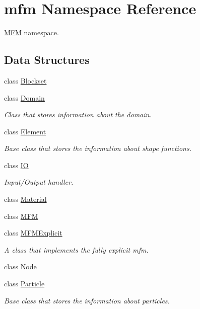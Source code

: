 \hypertarget{namespacemfm}{}\section{mfm Namespace Reference}
\label{namespacemfm}


\hyperlink{classmfm_1_1_m_f_m}{M\+FM} namespace.  


\subsection*{Data Structures}
\begin{DoxyCompactItemize}
\item 
class \hyperlink{classmfm_1_1_blockset}{Blockset}
\item 
class \hyperlink{classmfm_1_1_domain}{Domain}
\begin{DoxyCompactList}\small\item\em Class that stores information about the domain. \end{DoxyCompactList}\item 
class \hyperlink{classmfm_1_1_element}{Element}
\begin{DoxyCompactList}\small\item\em Base class that stores the information about shape functions. \end{DoxyCompactList}\item 
class \hyperlink{classmfm_1_1_i_o}{IO}
\begin{DoxyCompactList}\small\item\em Input/\+Output handler. \end{DoxyCompactList}\item 
class \hyperlink{classmfm_1_1_material}{Material}
\item 
class \hyperlink{classmfm_1_1_m_f_m}{M\+FM}
\item 
class \hyperlink{classmfm_1_1_m_f_m_explicit}{M\+F\+M\+Explicit}
\begin{DoxyCompactList}\small\item\em A class that implements the fully explicit mfm. \end{DoxyCompactList}\item 
class \hyperlink{classmfm_1_1_node}{Node}
\item 
class \hyperlink{classmfm_1_1_particle}{Particle}
\begin{DoxyCompactList}\small\item\em Base class that stores the information about particles. \end{DoxyCompactList}\item 

\end{DoxyCompactItemize}
